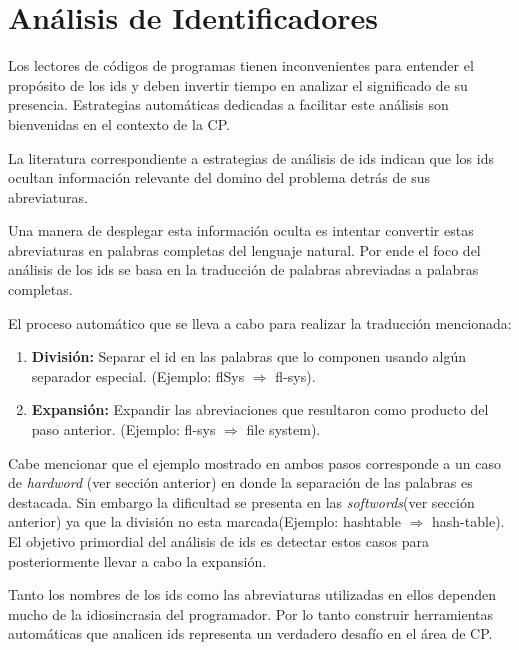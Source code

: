 \documentclass[12pt]{report}
\begin{document}
\pagebreak
\section{Análisis de Identificadores}

Los lectores de códigos de programas tienen inconvenientes para entender el propósito de los ids y deben invertir tiempo en analizar el significado de su presencia. Estrategias automáticas dedicadas a facilitar este análisis son bienvenidas en el contexto de la CP.

La literatura correspondiente a estrategias de análisis de ids indican que los ids ocultan información relevante del domino del problema detrás de sus abreviaturas\cite{EHPV09,LFBEX07}. 

Una manera de desplegar esta información oculta es intentar convertir estas abreviaturas en palabras completas del lenguaje natural. Por ende el foco del análisis de los ids se basa en la traducción de palabras abreviadas a palabras completas.


El proceso automático que se lleva a cabo para realizar la traducción mencionada\cite{LFBEX07}:

\begin{enumerate}
\itemsep0em%
\item \textbf{División:} Separar el id en las palabras que lo componen usando algún separador especial. (Ejemplo: \textsf{flSys} $\Rightarrow$ \textsf{fl-sys}).

\item \textbf{Expansión:} Expandir las abreviaciones que resultaron como producto del paso anterior. (Ejemplo: \textsf{fl-sys} $\Rightarrow$ \textsf{file system}).
\end{enumerate}

Cabe mencionar que el ejemplo mostrado en ambos pasos corresponde a un caso de \textit{hardword} (ver sección anterior) en donde la separación de las palabras es destacada. Sin embargo la dificultad se presenta en las \textit{softwords}(ver sección anterior) ya que la división no esta marcada(Ejemplo: \textsf{hashtable} $\Rightarrow$ \textsf{hash-table}). El objetivo primordial del análisis de ids es detectar estos casos para posteriormente llevar a cabo la expansión\cite{HFDL06}.  

Tanto los nombres de los ids como las abreviaturas utilizadas en ellos dependen mucho de la idiosincrasia del programador. Por lo tanto construir herramientas automáticas que analicen ids representa un verdadero desafío en el área de CP.
\end{document}
